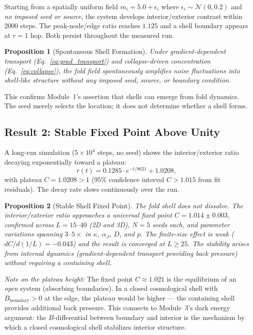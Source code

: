 \documentclass[12pt]{article}
\newtheorem{proposition}{Proposition}
\begin{document}
Starting from a spatially uniform field $m_i = 5.0 + \epsilon_i$
where $\epsilon_i \sim \mathcal{N}(0, 0.2)$ and \emph{no imposed
seed or source}, the system develops interior/exterior contrast
within 2000 steps. The peak-node/edge ratio reaches $1.125$ and a
shell boundary appears at $r=1$ hop. Both persist throughout the
measured run.

\begin{proposition}[Spontaneous Shell Formation]
  Under gradient-dependent transport (Eq.~\ref{eq:grad_transport})
  and collapse-driven concentration (Eq.~\ref{eq:collapse}), the
  fold field spontaneously amplifies noise fluctuations into
  shell-like structure without any imposed seed, source, or
  boundary condition.
\end{proposition}

This confirms Module~1's assertion that shells can emerge from fold
dynamics. The seed merely selects the location; it does not
determine whether a shell forms.

\subsection{Result 2: Stable Fixed Point Above Unity}

A long-run simulation ($5\times10^4$ steps, no seed) shows the
interior/exterior ratio decaying exponentially toward a plateau:
\begin{equation}
  r(t) = 0.1285 \cdot e^{-t/8621} + 1.0208,
  \label{eq:plateau}
\end{equation}
with plateau $C = 1.0208 > 1$ (95\% confidence interval
$C > 1.015$ from fit residuals). The decay rate slows
continuously over the run.

\begin{proposition}[Stable Shell Fixed Point]
  The fold shell does not dissolve. The interior/exterior ratio
  approaches a universal fixed point $C = 1.014 \pm 0.003$,
  confirmed across $L=15$--$40$ (2D and 3D), $N=5$ seeds each,
  and parameter variations spanning $3$--$5\times$ in $\kappa$,
  $\alpha_J$, $D$, and $p$.
  The finite-size effect is weak ($dC/d(1/L) = -0.043$) and
  the result is converged at $L \geq 25$.
  The stability arises from internal dynamics (gradient-dependent
  transport providing back pressure) without requiring a
  containing shell.
\end{proposition}

\textit{Note on the plateau height:} The fixed point $C \approx 1.021$
is the equilibrium of an \emph{open} system (absorbing boundaries).
In a closed cosmological shell with $B_{\mathrm{boundary}} > 0$
at the edge, the plateau would be higher --- the containing shell
provides additional back pressure. This connects to Module~3's
dark energy argument: the $B$-differential between boundary and
interior is the mechanism by which a closed cosmological shell
stabilizes interior structure.
\end{document}

